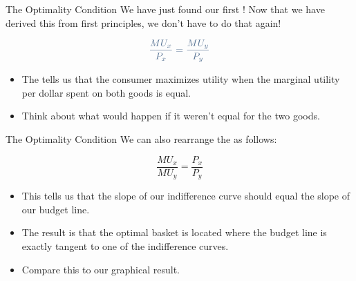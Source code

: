 \documentclass{beamer}
\begin{document}
\begin{frame}{The Optimality Condition}
  We have just found our first ! Now that we have derived this from first principles, we don't have to do that again!

  $$
    \navy{\frac{MU_x}{P_x} = \frac{MU_y}{P_y}}
  $$

  \bigskip
  \begin{itemize}
    \item The  tells us that the consumer maximizes utility when the marginal utility per dollar spent on both goods is equal.
    \item Think about what would happen if it weren't equal for the two goods.
  \end{itemize}
\end{frame}

\begin{frame}{The Optimality Condition}
  We can also rearrange the  as follows:

  $$
    \frac{MU_x}{MU_y} = \frac{P_x}{P_y}
  $$

  \bigskip
  \begin{itemize}
    \item This tells us that the slope of our indifference curve should equal the slope of our budget line.
    \item The result is that the optimal basket is located where the budget line is exactly tangent to one of the indifference curves.
    \item Compare this to our graphical result.
  \end{itemize}
\end{frame}
\end{document}
